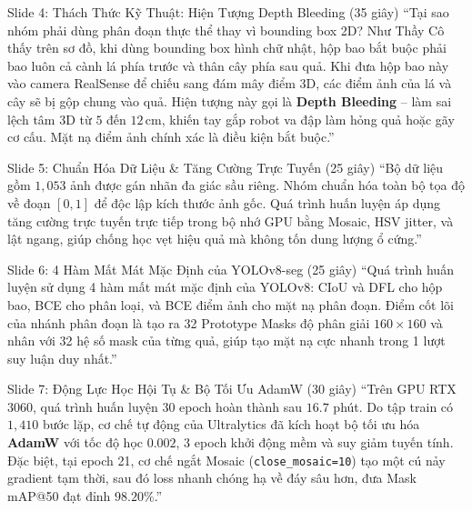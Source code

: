 \documentclass[11pt,a4paper]{article}
\begin{document}
\vspace{4pt}

\begin{scriptbox}{Slide 4: Thách Thức Kỹ Thuật: Hiện Tượng Depth Bleeding (35 giây)}
``Tại sao nhóm phải dùng phân đoạn thực thể thay vì bounding box 2D? Như Thầy Cô thấy trên sơ đồ, khi dùng bounding box hình chữ nhật, hộp bao bắt buộc phải bao luôn cả cành lá phía trước và thân cây phía sau quả. Khi đưa hộp bao này vào camera RealSense để chiếu sang đám mây điểm 3D, các điểm ảnh của lá và cây sẽ bị gộp chung vào quả. Hiện tượng này gọi là \textbf{Depth Bleeding} -- làm sai lệch tâm 3D từ $5$ đến $12\,\text{cm}$, khiến tay gắp robot va đập làm hỏng quả hoặc gãy cơ cấu. Mặt nạ điểm ảnh chính xác là điều kiện bắt buộc.''
\end{scriptbox}

\vspace{4pt}

\begin{scriptbox}{Slide 5: Chuẩn Hóa Dữ Liệu \& Tăng Cường Trực Tuyến (25 giây)}
``Bộ dữ liệu gồm $1,053$ ảnh được gán nhãn đa giác sầu riêng. Nhóm chuẩn hóa toàn bộ tọa độ về đoạn $[0, 1]$ để độc lập kích thước ảnh gốc. Quá trình huấn luyện áp dụng tăng cường trực tuyến trực tiếp trong bộ nhớ GPU bằng Mosaic, HSV jitter, và lật ngang, giúp chống học vẹt hiệu quả mà không tốn dung lượng ổ cứng.''
\end{scriptbox}

\vspace{4pt}

\begin{scriptbox}{Slide 6: 4 Hàm Mất Mát Mặc Định của YOLOv8-seg (25 giây)}
``Quá trình huấn luyện sử dụng 4 hàm mất mát mặc định của YOLOv8: CIoU và DFL cho hộp bao, BCE cho phân loại, và BCE điểm ảnh cho mặt nạ phân đoạn. Điểm cốt lõi của nhánh phân đoạn là tạo ra 32 Prototype Masks độ phân giải $160 \times 160$ và nhân với 32 hệ số mask của từng quả, giúp tạo mặt nạ cực nhanh trong 1 lượt suy luận duy nhất.''
\end{scriptbox}

\vspace{4pt}

\begin{scriptbox}{Slide 7: Động Lực Học Hội Tụ \& Bộ Tối Ưu AdamW (30 giây)}
``Trên GPU RTX 3060, quá trình huấn luyện 30 epoch hoàn thành sau $16.7$ phút. Do tập train có $1,410$ bước lặp, cơ chế tự động của Ultralytics đã kích hoạt bộ tối ưu hóa \textbf{AdamW} với tốc độ học $0.002$, 3 epoch khởi động mềm và suy giảm tuyến tính. Đặc biệt, tại epoch 21, cơ chế ngắt Mosaic (\texttt{close\_mosaic=10}) tạo một cú nảy gradient tạm thời, sau đó loss nhanh chóng hạ về đáy sâu hơn, đưa Mask mAP@50 đạt đỉnh $98.20\%$.''
\end{scriptbox}
\end{document}
